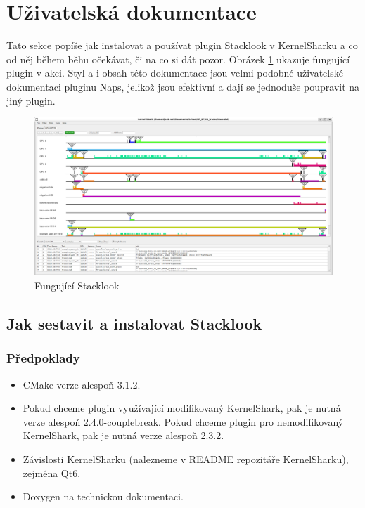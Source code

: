 \section{Uživatelská dokumentace}

Tato sekce popíše jak instalovat a používat plugin Stacklook v KernelSharku a co od něj během běhu očekávat, či na co si dát pozor. Obrázek \ref{SlWorking} ukazuje fungující plugin v akci. Styl a i obsah této dokumentace jsou velmi podobné uživatelské dokumentaci pluginu Naps, jelikož jsou efektivní a dají se jednoduše poupravit na jiný plugin.

\begin{figure}[p]\centering
    \includegraphics[width=140mm]{img/Stacklook/SlWorking}
    \caption{Fungující Stacklook}
    \label{SlWorking}
\end{figure}

\subsection{Jak sestavit a instalovat Stacklook}

\subsubsection*{Předpoklady}

\begin{itemize}
  \item CMake verze alespoň 3.1.2.
  \item Pokud chceme plugin využívající modifikovaný KernelShark, pak je nutná verze alespoň 2.4.0-couplebreak. Pokud chceme plugin pro nemodifikovaný KernelShark, pak je nutná verze alespoň 2.3.2.
  \item Závislosti KernelSharku (nalezneme v README repozitáře KernelSharku), zejména Qt6.
  \item Doxygen na technickou dokumentaci.
\end{itemize}

